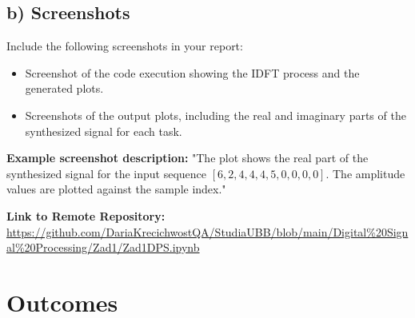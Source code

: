 \documentclass[12pt]{article}
\begin{document}
\subsection{b) Screenshots}

Include the following screenshots in your report:
\begin{itemize}
    \item Screenshot of the code execution showing the IDFT process and the generated plots.
    \item Screenshots of the output plots, including the real and imaginary parts of the synthesized signal for each task.
\end{itemize}

\textbf{Example screenshot description:} "The plot shows the real part of the synthesized signal for the input sequence \( [6, 2, 4, 4, 4,5,0, 0, 0, 0] \). The amplitude values are plotted against the sample index."

\textbf{Link to Remote Repository:} \url{https://github.com/DariaKrecichwostQA/StudiaUBB/blob/main/Digital%20Signal%20Processing/Zad1/Zad1DPS.ipynb}

\section{Outcomes}
\end{document}
